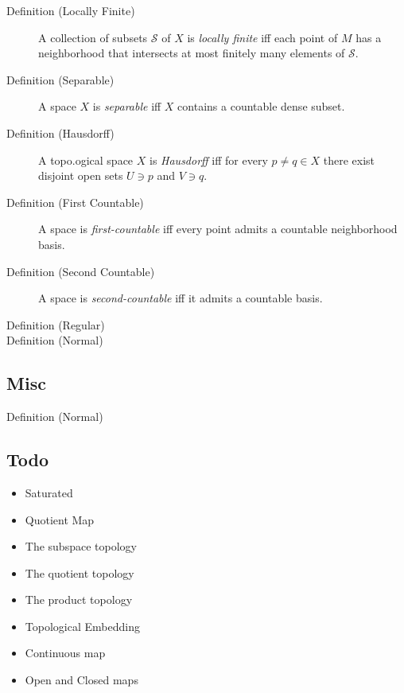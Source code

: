 \begin{description}
\item[Definition (Locally Finite)]
A collection of subsets \({\mathcal{S}}\) of \(X\) is \emph{locally
finite} iff each point of \(M\) has a neighborhood that intersects at
most finitely many elements of \({\mathcal{S}}\).
\item[Definition (Separable)]
A space \(X\) is \emph{separable} iff \(X\) contains a countable dense
subset.
\item[Definition (Hausdorff)]
A topo.ogical space \(X\) is \emph{Hausdorff} iff for every
\(p\neq q \in X\) there exist disjoint open sets \(U\ni p\) and
\(V\ni q\).
\item[Definition (First Countable)]
A space is \emph{first-countable} iff every point admits a countable
neighborhood basis.
\item[Definition (Second Countable)]
A space is \emph{second-countable} iff it admits a countable basis.
\item[Definition (Regular)]
\item[Definition (Normal)]
\end{description}

\hypertarget{misc}{%
\subsection{Misc}\label{misc}}

\begin{description}
\item[Definition (Normal)]
\end{description}

\hypertarget{todo}{%
\subsection{Todo}\label{todo}}

\begin{itemize}
\tightlist
\item
  Saturated
\item
  Quotient Map
\item
  The subspace topology
\item
  The quotient topology
\item
  The product topology
\item
  Topological Embedding
\item
  Continuous map
\item
  Open and Closed maps
\end{itemize}

